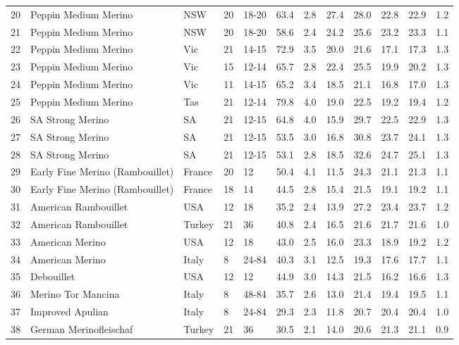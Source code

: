 \begin{center}
\begin{landscape}
\begin{longtable}{|p{0.4in}|p{0.9in}|p{0.7in}|p{0.4in}|p{0.45in}|p{0.45in}|p{0.45in}|p{0.45in}|p{0.45in}|p{0.45in}|p{0.45in}|p{0.45in}|}
 20 &  Peppin Medium Merino &  NSW & 20 &  18-20 & 63.4 & 2.8 & 27.4 & 28.0 & 22.8 & 22.9 & 1.2 \\ 
 21 &  Peppin Medium Merino &  NSW & 20 &  18-20 & 58.6 & 2.4 & 24.2 & 25.6 & 23.2 & 23.3 & 1.1 \\ 
 22 &  Peppin Medium Merino &  Vic & 21 &  14-15 & 72.9 & 3.5 & 20.0 & 21.6 & 17.1 & 17.3 & 1.3 \\ 
 23 &  Peppin Medium Merino &  Vic & 15 &  12-14 & 65.7 & 2.8 & 22.4 & 25.5 & 19.9 & 20.2 & 1.3 \\ 
 24 &  Peppin Medium Merino &  Vic & 11 &  14-15 & 65.2 & 3.4 & 18.5 & 21.1 & 16.8 & 17.0 & 1.3 \\ 
 25 &  Peppin Medium Merino &  Tas & 21 &  12-14 & 79.8 & 4.0 & 19.0 & 22.5 & 19.2 & 19.4 & 1.2 \\ 
 26 &  SA Strong Merino &  SA & 21 &  12-15 & 64.8 & 4.0 & 15.9 & 29.7 & 22.5 & 22.9 & 1.3 \\ 
 27 &  SA Strong Merino &  SA & 21 &  12-15 & 53.5 & 3.0 & 16.8 & 30.8 & 23.7 & 24.1 & 1.3 \\ 
 28 &  SA Strong Merino &  SA & 21 &  12-15 & 53.1 & 2.8 & 18.5 & 32.6 & 24.7 & 25.1 & 1.3 \\ 
 29 &  Early Fine Merino (Rambouillet) &  France & 20 &  12 & 50.4 & 4.1 & 11.5 & 24.3 & 21.1 & 21.3 & 1.1 \\ 
 30 &  Early Fine Merino (Rambouillet) &  France & 18 &  14 & 44.5 & 2.8 & 15.4 & 21.5 & 19.1 & 19.2 & 1.1 \\ 
 31 &  American Rambouillet &  USA & 12 &  18 & 35.2 & 2.4 & 13.9 & 27.2 & 23.4 & 23.7 & 1.2 \\ 
 32 &  American Rambouillet &  Turkey & 21 &  36 & 40.8 & 2.4 & 16.5 & 21.6 & 21.7 & 21.6 & 1.0 \\ 
 33 &  American Merino &  USA & 12 &  18 & 43.0 & 2.5 & 16.0 & 23.3 & 18.9 & 19.2 & 1.2 \\ 
 34 &  American Merino &  Italy &  8 &  24-84 & 40.3 & 3.1 & 12.5 & 19.3 & 17.6 & 17.7 & 1.1 \\ 
 35 &  Debouillet &  USA & 12 &  12 & 44.9 & 3.0 & 14.3 & 21.5 & 16.2 & 16.6 & 1.3 \\ 
 36 &  Merino Tor Mancina &  Italy &  8 &  48-84 & 35.7 & 2.6 & 13.0 & 21.4 & 19.4 & 19.5 & 1.1 \\ 
 37 &  Improved Apulian &  Italy &  8 &  24-84 & 29.3 & 2.3 & 11.8 & 20.7 & 20.4 & 20.4 & 1.0 \\ 
 38 &  German Merinofleischaf &  Turkey & 21 &  36 & 30.5 & 2.1 & 14.0 & 20.6 & 21.3 & 21.1 & 0.9 \\ 

\end{longtable}
\end{landscape}
\end{center}

